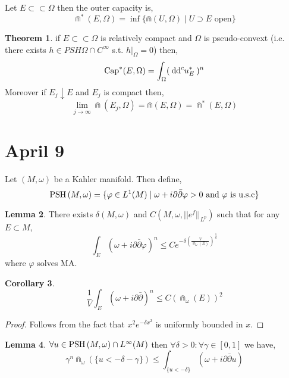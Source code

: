 \documentclass[12pt]{extarticle}
\theoremstyle{definition}
\newtheorem{theorem}{Theorem}[section]
\newtheorem{lemma}[theorem]{Lemma}
\newtheorem{corollary}[theorem]{Corollary}
\newenvironment{definition}[1][Definition:]{\begin{trivlist}
\item[\hskip \labelsep {\bfseries #1}]}{\end{trivlist}}
\begin{document}
\begin{definition}
Let $E \subset \subset \Omega$  then the outer capacity is,
\[ \Cap^*(E, \Omega) = \inf \{ \Cap(U, \Omega) \mid U \supset E \text{ open} \} \]
\end{definition}

\begin{theorem}
if $E \subset \subset \Omega$ is relatively compact and $\Omega$ is pseudo-convext (i.e. there exists $h \in PSH{\Omega} \cap C^\infty$ s.t. $h|_\Omega = 0$) then,
\[ \mathrm{Cap}^*(E, \Omega) = \int_\Omega (\: \mathrm{d}\mathrm{d}^c{u_E^*} \:)^n \] 
Moreover if $E_j \downarrow E$ and $E_j$ is compact then,
\[ \lim_{j \to \infty} \Cap(E_j, \Omega) = \Cap(E, \Omega) = \Cap^*(E, \Omega) \] 
\end{theorem}

\section{April 9}

\begin{definition}
Let $(M, \omega)$ be a Kahler manifold. Then define,
\[ \mathrm{PSH}\left( M,\omega \right) = \{ \varphi \in L^1(M) \mid \omega + i \partial \bar{\partial} \varphi > 0 \text{ and } \varphi \text{ is u.s.c} \} \]
\end{definition}


\begin{lemma}
There exists $\delta(M, \omega)$ and $C(M, \omega, ||e^f||_{L^p})$ such that for any $E \subset M$,
\[ \int_E (\omega + i \partial \bar{\partial} \varphi)^n \le C e^{-\delta \left( \frac{V}{\Cap_{\omega}(E)} \right)^{\frac{1}{n}}} \]
where $\varphi$ solves MA. 
\end{lemma}

\begin{corollary}
\[ \frac{1}{V} \int_E (\omega + i \partial \bar{\partial})^n \le C \left( \Cap_\omega(E) \right)^2 \]
\end{corollary}

\begin{proof}
Follows from the fact that $x^2 e^{-\delta x^2}$ is uniformly bounded in $x$.
\end{proof}

\begin{lemma}
$\forall u \in \mathrm{PSH}\left( M, \omega \right) \cap L^\infty(M)$ then $\forall \delta > 0 : \forall \gamma \in [0,1]$ we have,
\[ \gamma^n \Cap_{\omega}\left( \{ u < -\delta - \gamma \} \right) \le \int_{\{u < - \delta \}} (\omega + i \partial \bar{\partial} u) \]
\end{lemma}
\end{document}
